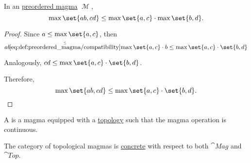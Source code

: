 \begin{proposition}\label{thm:preordered_magma_max_distributivity}
  In an \hyperref[def:preordered_magma]{preordered magma} \( \mscrM \),
  \begin{equation}\label{eq:thm:preordered_magma_max_distributivity}
    \max \set{a b, c d} \leq \max \set{a, c} \cdot \max \set{b, d}.
  \end{equation}
\end{proposition}
\begin{proof}
  Since \( a \leq \max \set{a, c} \), then
  \begin{equation*}
    ab
    \reloset \leq {\eqref{eq:def:preordered_magma/compatibility}}
    \max \set{a, c} \cdot b
    \leq
    \max \set{a, c} \cdot \set{b, d}
  \end{equation*}

  Analogously, \( cd \leq \max \set{a, c} \cdot \set{b, d} \).

  Therefore,
  \begin{equation}
    \max \set{a b, c d} \leq \max \set{a, c} \cdot \set{b, d}.
  \end{equation}
\end{proof}

\begin{definition}\label{def:topological_magma}
  A  is a magma equipped with a \hyperref[def:topological_space]{topology} such that the magma operation is continuous.

  The category of topological magmas is \hyperref[def:concrete_category]{concrete} with respect to both \( \cat{Mag} \) and \hyperref[def:category_of_topological_spaces]{\( \cat{Top} \)}.
\end{definition}
